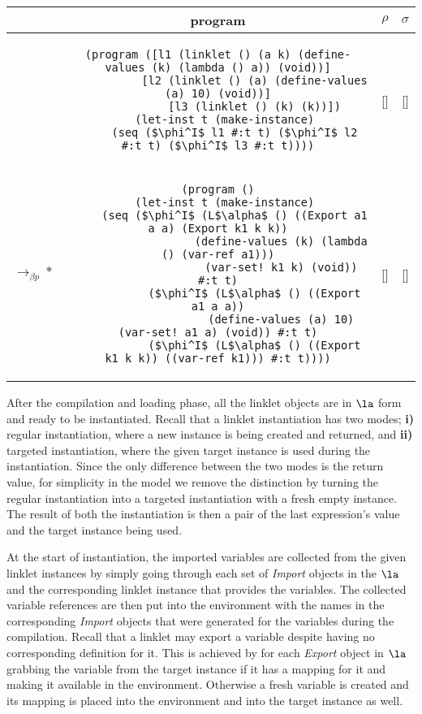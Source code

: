 \begin{table}[h!]
  \centering
  \footnotesize
  \begin{tabular}{lc|c|c}
    &\textbf{program} & \textbf{$\rho$} & \textbf{$\sigma$} \\ \hline \hline
    &\begin{lstlisting}[mathescape]
(program ([l1 (linklet () (a k) (define-values (k) (lambda () a)) (void))]
           [l2 (linklet () (a) (define-values (a) 10) (void))]
           [l3 (linklet () (k) (k))])
  (let-inst t (make-instance)
     (seq ($\phi^I$ l1 #:t t) ($\phi^I$ l2 #:t t) ($\phi^I$ l3 #:t t))))
    \end{lstlisting} & [] & [] \\ \hline
    $\longrightarrow_{\beta p}*$&\begin{lstlisting}[mathescape]
(program ()
  (let-inst t (make-instance)
     (seq ($\phi^I$ (L$\alpha$ () ((Export a1 a a) (Export k1 k k))
                   (define-values (k) (lambda () (var-ref a1)))
                   (var-set! k1 k) (void)) #:t t)
           ($\phi^I$ (L$\alpha$ () ((Export a1 a a))
                   (define-values (a) 10) (var-set! a1 a) (void)) #:t t)
           ($\phi^I$ (L$\alpha$ () ((Export k1 k k)) ((var-ref k1))) #:t t))))
    \end{lstlisting} & [] & [] \\ \hline
  \end{tabular}
\end{table}

After the compilation and loading phase, all the linklet objects are
in $\la$ form and ready to be instantiated. Recall that a linklet
instantiation has two modes; \textbf{i)} regular instantiation, where
a new instance is being created and returned, and \textbf{ii)}
targeted instantiation, where the given target instance is used during
the instantiation. Since the only difference between the two modes is
the return value, for simplicity in the model we remove the
distinction by turning the regular instantiation into a targeted
instantiation with a fresh empty instance. The result of both the
instantiation is then a pair of the last expression's value and the
target instance being used.

At the start of instantiation, the imported variables are collected
from the given linklet instances by simply going through each set of
\emph{Import} objects in the $\la$ and the corresponding linklet
instance that provides the variables. The collected variable
references are then put into the environment with the names in the
corresponding \emph{Import} objects that were generated for the
variables during the compilation. Recall that a linklet may export a
variable despite having no corresponding definition for it. This is
achieved by for each \emph{Export} object in $\la$ grabbing the
variable from the target instance if it has a mapping for it and
making it available in the environment. Otherwise a fresh variable is
created and its mapping is placed into the environment and into the
target instance as well.

